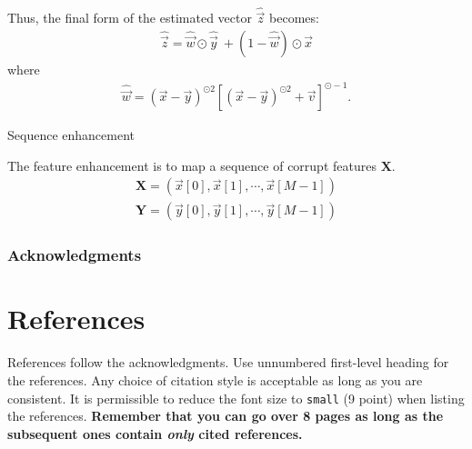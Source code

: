 \documentclass{article}
\begin{document}
Thus, the final form of the estimated vector $\widehat{\vec{z}}$ becomes:
\begin{align}
  \widehat{\vec{z}} = \widehat{\vec{w}} \odot \widehat{\vec{y}}
    \ + (1 - \widehat{\vec{w}}) \odot \vec{x}
\end{align}
where
\begin{align}
  \widehat{\vec{w}} = {(\vec{x} - \vec{y})^{\odot 2}}
    \left[(\vec{x} - \vec{y})^{\odot 2}+ \vec{v}\right]^{\odot -1}.
\end{align}


Sequence enhancement

The feature enhancement is to map a sequence of corrupt features $\mathbf{X}$.
\begin{subequations}
  \begin{align}
    \mathbf{X} = \left(\vec{x}[0], \vec{x}[1], \cdots, \vec{x}[M-1] \right)  \\
    \mathbf{Y} = \left(\vec{y}[0], \vec{y}[1], \cdots, \vec{y}[M-1] \right) 
  \end{align}
\end{subequations}

\subsubsection*{Acknowledgments}

\section*{References}

References follow the acknowledgments. Use unnumbered first-level
heading for the references. Any choice of citation style is acceptable
as long as you are consistent. It is permissible to reduce the font
size to \verb+small+ (9 point) when listing the references. {\bf
  Remember that you can go over 8 pages as long as the subsequent ones contain
  \emph{only} cited references.}
\medskip

\small

\clearpage
\newpage


\end{document}
